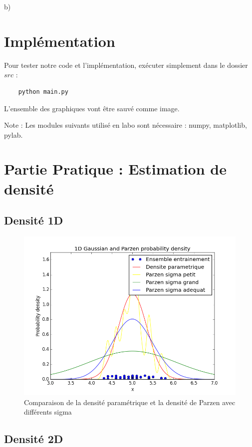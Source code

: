 \documentclass[a4paper,10pt]{article}
\begin{document}
b)

\section{Implémentation}

Pour tester notre code et l'implémentation, exécuter simplement dans le dossier $src$ :
\begin{verbatim}
	python main.py
\end{verbatim}
L'ensemble des graphiques vont être sauvé comme image.

Note : Les modules suivants utilisé en labo sont nécessaire : numpy, matplotlib, pylab.


\section{Partie Pratique : Estimation de densité}

\subsection{Densité 1D}

\begin{figure}[H]
	\includegraphics[width=12cm]{images/1D_Gaussian_and_Parzen_probability_density.png} 
	\centering
	\caption{Comparaison de la densité paramétrique et la densité de Parzen avec différents sigma}
	\label{fig:comp}
\end{figure}

\subsection{Densité 2D}
\end{document}
